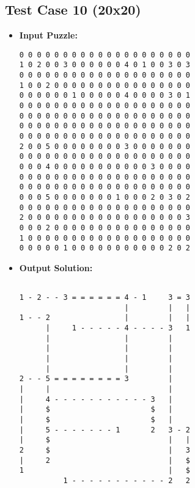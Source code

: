 \subsection{Test Case 10 (20x20)}
\begin{itemize}
    \item \textbf{Input Puzzle:}
    \begin{verbatim}
0 0 0 0 0 0 0 0 0 0 0 0 0 0 0 0 0 0 0 0
1 0 2 0 0 3 0 0 0 0 0 0 4 0 1 0 0 3 0 3
0 0 0 0 0 0 0 0 0 0 0 0 0 0 0 0 0 0 0 0
1 0 0 2 0 0 0 0 0 0 0 0 0 0 0 0 0 0 0 0
0 0 0 0 0 0 1 0 0 0 0 0 4 0 0 0 0 3 0 1
0 0 0 0 0 0 0 0 0 0 0 0 0 0 0 0 0 0 0 0
0 0 0 0 0 0 0 0 0 0 0 0 0 0 0 0 0 0 0 0
0 0 0 0 0 0 0 0 0 0 0 0 0 0 0 0 0 0 0 0
0 0 0 0 0 0 0 0 0 0 0 0 0 0 0 0 0 0 0 0
2 0 0 5 0 0 0 0 0 0 0 0 3 0 0 0 0 0 0 0
0 0 0 0 0 0 0 0 0 0 0 0 0 0 0 0 0 0 0 0
0 0 0 4 0 0 0 0 0 0 0 0 0 0 0 3 0 0 0 0
0 0 0 0 0 0 0 0 0 0 0 0 0 0 0 0 0 0 0 0
0 0 0 0 0 0 0 0 0 0 0 0 0 0 0 0 0 0 0 0
0 0 0 5 0 0 0 0 0 0 0 1 0 0 0 2 0 3 0 2
0 0 0 0 0 0 0 0 0 0 0 0 0 0 0 0 0 0 0 0
2 0 0 0 0 0 0 0 0 0 0 0 0 0 0 0 0 0 0 3
0 0 0 2 0 0 0 0 0 0 0 0 0 0 0 0 0 0 0 0
1 0 0 0 0 0 0 0 0 0 0 0 0 0 0 0 0 0 0 0
0 0 0 0 0 1 0 0 0 0 0 0 0 0 0 0 0 2 0 2

    \end{verbatim}
    \item \textbf{Output Solution:}
    \begin{verbatim}
                                       
1 - 2 - - 3 = = = = = = 4 - 1     3 = 3
                        |         |   |
1 - - 2                 |         |   |
      |     1 - - - - - 4 - - - - 3   1
      |                 |         |    
      |                 |         |    
      |                 |         |    
      |                 |         |    
2 - - 5 = = = = = = = = 3         |    
|     |                           |    
|     4 - - - - - - - - - - - 3   |    
|     $                       $   |    
|     $                       $   |    
|     5 - - - - - - - 1       2   3 - 2
|     $                           |   |
2     $                           |   3
|     2                           |   $
1                                 |   $
          1 - - - - - - - - - - - 2   2
    \end{verbatim}
\end{itemize}
